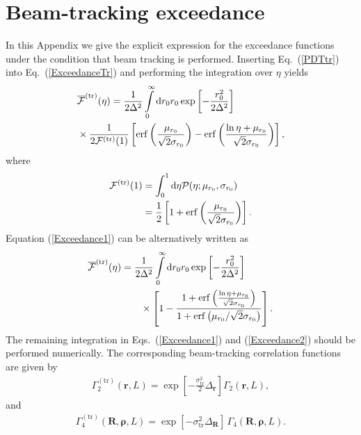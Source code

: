 \documentclass[aps,pra,twocolumn,a4paper,nofootinbib,preprintnumbers] {revtex4-1}
\newcommand{\D}{{\rm{d}}}
\begin{document}
\section{Beam-tracking exceedance}\label{app:exceedance}

	In this Appendix we give the explicit expression for the exceedance functions under the condition that beam tracking is performed.
	Inserting Eq.~(\ref{PDTtr}) into Eq.~(\ref{ExceedanceTr}) and performing the integration over $\eta$ yields
		\begin{align}\label{Exceedance1}
		&\overline{\mathcal{F}}^{(\mathrm{tr})}(\eta)=\frac{1}{2\Delta^2}\int\limits_0^\infty\D r_0 r_0 \exp\left[-\frac{r_0^2}{2\Delta^2}\right]\nonumber\\
		&\times\frac{1}{2\mathcal{F}^{(\mathrm{tr})}(1)}\left[\mathrm{erf}\left(\frac{\mu_{r_0}}{\sqrt{2}\sigma_{r_0}}\right)-\mathrm{erf}\left(\frac{\ln\eta+\mu_{r_0}}{\sqrt{2}\sigma_{r_0}}\right)\right],
		\end{align}
	where
		\begin{align}
		\mathcal{F}^{(\mathrm{tr})}(1)&=\int_0^1\D\eta \mathcal{P}(\eta;\mu_{r_0},\sigma_{r_0})\nonumber\\
		&=\frac{1}{2}\left[1+\mathrm{erf}\left(\frac{\mu_{r_0}}{\sqrt{2}\sigma_{r_0}}\right)\right].
		\end{align}
	Equation (\ref{Exceedance1}) can be alternatively written  as
		\begin{align}\label{Exceedance2}
		\overline{\mathcal{F}}^{(\mathrm{tr})}(\eta)&=\frac{1}{2\Delta^2}\int\limits_0^\infty\D r_0 r_0 \exp\left[-\frac{r_0^2}{2\Delta^2}\right]\nonumber\\
		&\qquad\times\left[1- \frac{1+\mathrm{erf}\left(\frac{\ln\eta+\mu_{r_0}}{\sqrt{2}\sigma_{r_0}}\right)}{1+\mathrm{erf}\left( \mu_{r_0}/\sqrt{2}\sigma_{r_0}\right)}\right].
		\end{align}	
	The remaining integration in Eqs.~(\ref{Exceedance1}) and (\ref{Exceedance2}) should be performed numerically.
	The corresponding beam-tracking correlation functions are given by
		\begin{align} \label{TrackedGamma2}
		\Gamma_2^{(\mathrm{tr})}(\boldsymbol{r},L){=}\exp\left[-\frac{\sigma_{\mathrm{tr}}^2}{2}\Delta_{\boldsymbol{r}}\right]\Gamma_{2}(\boldsymbol{r},L),
		\end{align}
	and
		\begin{align}\label{TrackedGamma4}
		\Gamma_4^{(\mathrm{tr})}(\boldsymbol{R},\boldsymbol{\rho},L){=}\exp\left[-\sigma_{\mathrm{tr}}^2
		\Delta_{\boldsymbol{R}}\right]\,\Gamma_{4}(\boldsymbol{R},\boldsymbol{\rho},L).
		\end{align}
\end{document}
